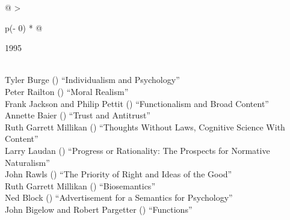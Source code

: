 \documentclass[
  10pt,
  letterpaper,
  DIV=11,
  numbers=noendperiod,
  twoside]{scrartcl}
\begin{document}
\begin{longtable}[]{@{}
  >{\raggedright\arraybackslash}p{(\columnwidth - 0\tabcolsep) * }@{}}

\caption{\label{tbl-top-ten-1986}Most cited articles published less than
ten years ago as of 1995.}

\tabularnewline

\toprule\noalign{}
\begin{minipage}[b]{\linewidth}\raggedright
1995
\end{minipage} \\
\midrule\noalign{}
\endhead
\bottomrule\noalign{}
\endlastfoot
Tyler Burge
()
``Individualism and Psychology'' \\
Peter Railton
()
``Moral Realism'' \\
Frank Jackson and Philip Pettit
()
``Functionalism and Broad Content'' \\
Annette Baier
()
``Trust and Antitrust'' \\
Ruth Garrett Millikan
()
``Thoughts Without Laws, Cognitive Science With Content'' \\
Larry Laudan
()
``Progress or Rationality: The Prospects for Normative Naturalism'' \\
John Rawls
()
``The Priority of Right and Ideas of the Good'' \\
Ruth Garrett Millikan
()
``Biosemantics'' \\
Ned Block
()
``Advertisement for a Semantics for Psychology'' \\
John Bigelow and Robert Pargetter
()
``Functions'' \\

\end{longtable}
\end{document}
